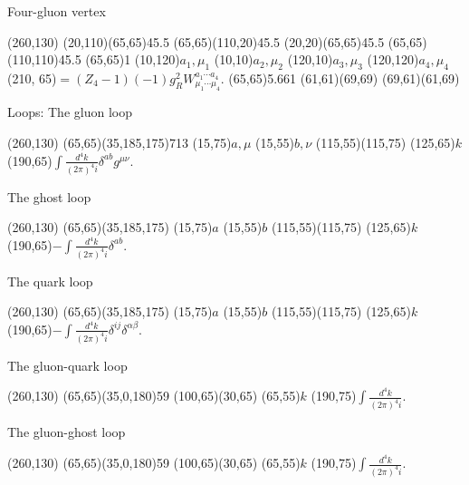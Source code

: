 Four-gluon vertex

\begin{axopicture}(260,130) %
	\Gluon(20,110)(65,65){4}{5.5}
	\Gluon(65,65)(110,20){4}{5.5}
	\Gluon(20,20)(65,65){4}{5.5}
	\Gluon(65,65)(110,110){4}{5.5}
	\Vertex(65,65){1}		
	\Text(10,120){$a_1,\mu_1$}
	\Text(10,10){$a_2,\mu_2$}
	\Text(120,10){$a_3,\mu_3$}
	\Text(120,120){$a_4,\mu_4$}
	\Text(210, 65){$=(Z_4-1)(-1)g_R^2W^{a_1\cdots a_4}_{\mu_1\cdots\mu_4}.$}
	\GCirc(65,65){5.66}{1}	
	\Line(61,61)(69,69)
	\Line(69,61)(61,69)	 %
\end{axopicture}

Loops:
\newline
The gluon loop

\begin{axopicture}(260,130) %
	\GluonArc(65,65)(35,185,175){7}{13}
	\Text(15,75){$a,\mu$}
	\Text(15,55){$b,\nu$}
	\Line[arrow](115,55)(115,75)
	\Text(125,65){$k$}
	\Text(190,65){$\int\frac{d^4k}{(2\pi)^4i}\delta^{ab}g^{\mu\nu}.$}
\end{axopicture}
\newline
The ghost loop

\begin{axopicture}(260,130) %
	(65,65)(35,185,175)
	\Text(15,75){$a$}
	\Text(15,55){$b$}
	\Line[arrow](115,55)(115,75)
	\Text(125,65){$k$}
	\Text(190,65){$-\int\frac{d^4k}{(2\pi)^4i}\delta^{ab}.$}
\end{axopicture}
\newline
The quark loop

\begin{axopicture}(260,130) %
	\Arc[arrow](65,65)(35,185,175)
	\Text(15,75){$a$}
	\Text(15,55){$b$}
	\Line[arrow](115,55)(115,75)
	\Text(125,65){$k$}
	\Text(190,65){$-\int\frac{d^4k}{(2\pi)^4i}\delta^{ij}\delta^{\alpha\beta}.$}
\end{axopicture}
\newline
The gluon-quark loop

\begin{axopicture}(260,130) %
	\GluonArc(65,65)(35,0,180){5}{9}
	\Line[arrow](100,65)(30,65)
	\Text(65,55){$k$}
	\Text(190,75){$\int\frac{d^4k}{(2\pi)^4i}.$}
\end{axopicture}
\newline
The gluon-ghost loop

\begin{axopicture}(260,130) %
	\GluonArc(65,65)(35,0,180){5}{9}
	(100,65)(30,65)
	\Text(65,55){$k$}
	\Text(190,75){$\int\frac{d^4k}{(2\pi)^4i}.$}
\end{axopicture}


